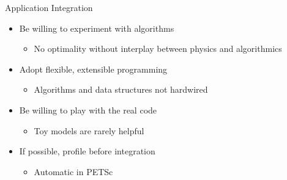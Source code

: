 \begin{frame}{Application Integration}

\begin{itemize}
  \item Be willing to experiment with algorithms
  \begin{itemize}
    \item No optimality without interplay between physics and algorithmics
  \end{itemize}

  \item Adopt flexible, extensible programming
  \begin{itemize}
    \item Algorithms and data structures not hardwired
  \end{itemize}

  \item Be willing to play with the real code
  \begin{itemize}
    \item Toy models are rarely helpful
  \end{itemize}

  \item If possible, profile before integration
  \begin{itemize}
    \item Automatic in PETSc
  \end{itemize}
\end{itemize}

\end{frame}
